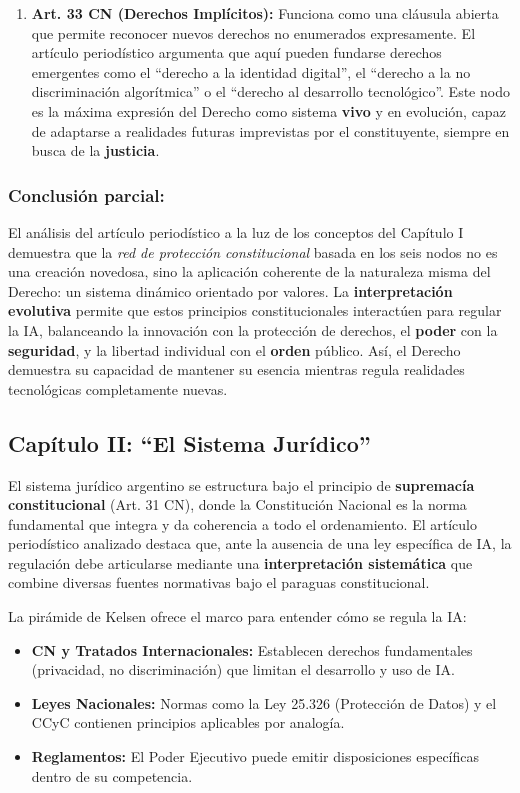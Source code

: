 \documentclass[10pt, a4paper]{article}
\begin{document}
\begin{enumerate}
    \item \textbf{Art. 33 CN (Derechos Implícitos):} Funciona como una cláusula abierta que permite reconocer nuevos derechos no enumerados expresamente. El artículo periodístico argumenta que aquí pueden fundarse derechos emergentes como el ``derecho a la identidad digital'', el ``derecho a la no discriminación algorítmica'' o el ``derecho al desarrollo tecnológico''. Este nodo es la máxima expresión del Derecho como sistema \textbf{vivo} y en evolución, capaz de adaptarse a realidades futuras imprevistas por el constituyente, siempre en busca de la \textbf{justicia}.
\end{enumerate}

\subsubsection*{Conclusión parcial:}
El análisis del artículo periodístico a la luz de los conceptos del Capítulo I demuestra que la \emph{red de protección constitucional} basada en los seis nodos no es una creación novedosa, sino la aplicación coherente de la naturaleza misma del Derecho: un sistema dinámico orientado por valores. La \textbf{interpretación evolutiva} permite que estos principios constitucionales interactúen para regular la IA, balanceando la innovación con la protección de derechos, el \textbf{poder} con la \textbf{seguridad}, y la libertad individual con el \textbf{orden} público. Así, el Derecho demuestra su capacidad de mantener su esencia mientras regula realidades tecnológicas completamente nuevas.

\subsection{Capítulo II: ``El Sistema Jurídico''}
\label{subsec:sistema}

El sistema jurídico argentino se estructura bajo el principio de \textbf{supremacía constitucional} (Art. 31 CN), donde la Constitución Nacional es la norma fundamental que integra y da coherencia a todo el ordenamiento. El artículo periodístico analizado \textcite{articulo_ia} destaca que, ante la ausencia de una ley específica de IA, la regulación debe articularse mediante una \textbf{interpretación sistemática} que combine diversas fuentes normativas bajo el paraguas constitucional.

La pirámide de Kelsen ofrece el marco para entender cómo se regula la IA:
\begin{itemize}
    \item \textbf{CN y Tratados Internacionales:} Establecen derechos fundamentales (privacidad, no discriminación) que limitan el desarrollo y uso de IA.
    \item \textbf{Leyes Nacionales:} Normas como la Ley 25.326 (Protección de Datos) y el CCyC contienen principios aplicables por analogía.
    \item \textbf{Reglamentos:} El Poder Ejecutivo puede emitir disposiciones específicas dentro de su competencia.
\end{itemize}
\end{document}
